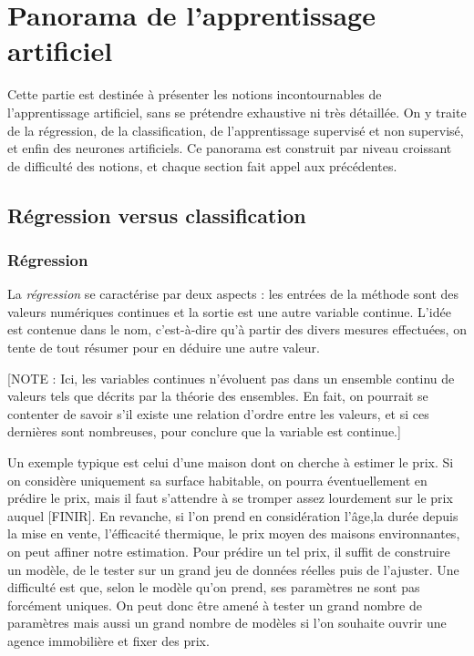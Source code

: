 \chapter{Panorama de l'apprentissage artificiel}

Cette partie est destinée à présenter les notions incontournables de l'apprentissage artificiel, sans se prétendre exhaustive ni très détaillée. On y traite de la régression, de la classification, de l'apprentissage supervisé et non supervisé, et enfin des neurones artificiels. Ce panorama est construit par niveau croissant de difficulté des notions, et chaque section fait appel aux précédentes.

\section{Régression versus classification}
\subsection{Régression}

La \emph{régression} se caractérise par deux aspects : les entrées de la méthode sont des valeurs numériques continues et la sortie est une autre variable continue. L'idée est contenue dans le nom, c'est-à-dire qu'à partir des divers mesures effectuées, on tente de tout résumer pour en déduire une autre valeur.

[NOTE : Ici, les variables continues n'évoluent pas dans un ensemble continu de valeurs tels que décrits par la théorie des ensembles. En fait, on pourrait se contenter de savoir s'il existe une relation d'ordre entre les valeurs, et si ces dernières sont nombreuses, pour conclure que la variable est continue.]

Un exemple typique est celui d'une maison dont on cherche à estimer le prix. Si on considère uniquement sa surface habitable, on pourra éventuellement en prédire le prix, mais il faut s'attendre à se tromper assez lourdement sur le prix auquel [FINIR]. En revanche, si l'on prend en considération l'âge,la durée depuis la mise en vente, l'éfficacité thermique, le prix moyen des maisons environnantes, on peut affiner notre estimation. Pour prédire un tel prix, il suffit de construire un modèle, de le tester sur un grand jeu de données réelles puis de l'ajuster. Une difficulté est que, selon le modèle qu'on prend, ses paramètres ne sont pas forcément uniques. On peut donc être amené à tester un grand nombre de paramètres mais aussi un grand nombre de modèles si l'on souhaite ouvrir une agence immobilière et fixer des prix.

